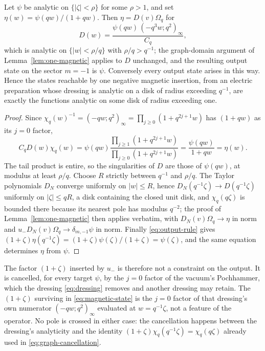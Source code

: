 \begin{proposition}\label{prop:reachable}
Let $\psi$ be analytic on $\{|\zeta|<\rho\}$ for some $\rho>1$, and set
$\eta(w)=\psi(qw)/(1+qw)$. Then $\eta=D(v)\Omega_q$ for
\begin{equation}\label{eq:reach-dressing}
 D(w)=\frac{\psi(qw)\,(-q^3w;q^2)_\infty}{C_q},
\end{equation}
which is analytic on $\{|w|<\rho/q\}$ with $\rho/q>q^{-1}$; the graph-domain
argument of Lemma~\ref{lem:one-magnetic} applies to $D$ unchanged, and the
resulting output state on the sector $m=-1$ is $\psi$. Conversely every output
state arises in this way. Hence the states reachable by one negative magnetic
insertion, from an electric preparation whose dressing is analytic on a disk of
radius exceeding $q^{-1}$, are exactly the functions analytic on some disk of
radius exceeding one.
\end{proposition}
\begin{proof}
Since $\chi_q(w)^{-1}=(-qw;q^2)_\infty=\prod_{j\geq0}(1+q^{2j+1}w)$ has
$(1+qw)$ as its $j=0$ factor,
\[
 C_qD(w)\chi_q(w)
 =\psi(qw)\frac{\prod_{j\geq1}(1+q^{2j+1}w)}{\prod_{j\geq0}(1+q^{2j+1}w)}
 =\frac{\psi(qw)}{1+qw}=\eta(w).
\]
The tail product is entire, so the singularities of $D$ are those of
$\psi(qw)$, at modulus at least $\rho/q$. Choose $R$ strictly between $q^{-1}$
and $\rho/q$. The Taylor polynomials $D_N$ converge uniformly on $|w|\leq R$,
hence $D_N(q^{-1}\zeta)\to D(q^{-1}\zeta)$ uniformly on $|\zeta|\leq qR$, a
disk containing the closed unit disk, and $\chi_q(q\zeta)$ is bounded there
because its nearest pole has modulus $q^{-2}$; the proof of
Lemma~\ref{lem:one-magnetic} then applies verbatim, with $D_N(v)\Omega_q\to\eta$
in norm and $u_-D_N(v)\Omega_q\to\delta_{m,-1}\psi$ in norm. Finally
\eqref{eq:output-rule} gives
$(1+\zeta)\eta(q^{-1}\zeta)=(1+\zeta)\psi(\zeta)/(1+\zeta)=\psi(\zeta)$, and
the same equation determines $\eta$ from $\psi$.
\end{proof}

The factor $(1+\zeta)$ inserted by $u_-$ is therefore not a constraint on the
output. It is cancelled, for every target $\psi$, by the $j=0$ factor of the
vacuum's Pochhammer, which the dressing \eqref{eq:dressing} removes and another
dressing may retain. The $(1+\zeta)$ surviving in \eqref{eq:magnetic-state} is
the $j=0$ factor of that dressing's own numerator $(-qw;q^2)_\infty$ evaluated
at $w=q^{-1}\zeta$, not a feature of the operator. No pole is crossed in either
case: the cancellation happens between the dressing's analyticity and the
identity $(1+\zeta)\chi_q(q^{-1}\zeta)=\chi_q(q\zeta)$ already used in
\eqref{eq:graph-cancellation}.

